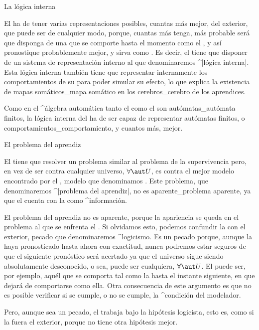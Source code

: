 \Section La lógica interna

El {\aprendiz} ha de tener varias representaciones posibles, cuantas más
mejor, del {\universo} exterior, que puede ser de cualquier modo,
porque, cuantas más tenga, más probable será que disponga de una que se
comporte hasta el momento como el {\universo}, y así pronostique
probablemente mejor, y sirva como {\realidad}. Es decir, el {\aprendiz}
tiene que disponer de un sistema de representación interno al que
denominaremos ^|lógica interna|. Esta lógica interna también tiene que
representar internamente los comportamientos de su {\cuerpo} para poder
simular su efecto, lo que explica la existencia de mapas somáticos_{mapa
somático} en los cerebros_{cerebro} de los aprendices.

Como en el ^{álgebra automática} tanto el {\universo} como el {\cuerpo}
son autómatas_{autómata} finitos, la lógica interna del {\aprendiz} ha
de ser capaz de representar autómatas finitos, o
comportamientos_{comportamiento}, y cuantos más, mejor.


\Section El problema del aprendiz

El {\simulador} tiene que resolver un problema similar al problema de la
supervivencia pero, en vez de ser contra cualquier universo, $\forall
\aut U$, es contra el mejor modelo encontrado por el {\modelador}, modelo
que denominamos {\realidad}. Este problema, que denominaremos ^|problema
del aprendiz|, no es aparente_{problema aparente}, ya que el
{\simulador} cuenta con la {\realidad} como ^{información}.

El problema del aprendiz no es aparente, porque la apariencia se queda
en el problema al que se enfrenta el {\modelador}. Si olvidamos esto,
podemos confundir la {\realidad} con el {\universo} exterior, pecado que
denominaremos ^{logicismo}. Es un pecado porque, aunque la {\realidad}
haya pronosticado hasta ahora con exactitud, nunca podremos estar
seguros de que el siguiente pronóstico será acertado ya que el universo
sigue siendo absolutamente desconocido, o sea, puede ser cualquiera,
$\forall \aut U$. El {\universo} puede ser, por ejemplo, aquél que se
comporta tal como la {\realidad} hasta el instante siguiente, en que
dejará de comportarse como ella. Otra consecuencia de este argumento es
que no es posible verificar si se cumple, o no se cumple, la ^{condición
del modelador}.

Pero, aunque sea un pecado, el {\simulador} trabaja bajo la hipótesis
logicista, esto es, como si la {\realidad} fuera el {\universo}
exterior, porque no tiene otra hipótesis mejor.


